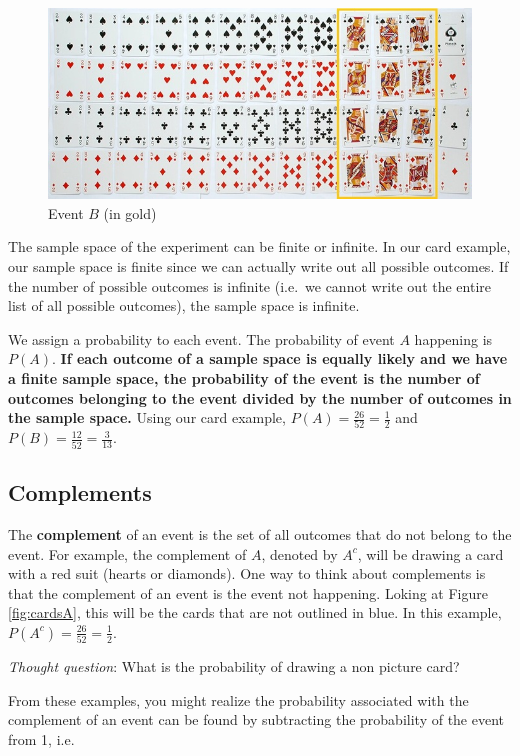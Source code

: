 \documentclass[
]{book}
\begin{document}
\begin{figure}
\centering
\includegraphics{images/02-cardsB.jpg}
\caption{\label{fig:cardsB}Event \(B\) (in gold)}
\end{figure}

The sample space of the experiment can be finite or infinite. In our card example, our sample space is finite since we can actually write out all possible outcomes. If the number of possible outcomes is infinite (i.e.~we cannot write out the entire list of all possible outcomes), the sample space is infinite.

We assign a probability to each event. The probability of event \(A\) happening is \(P(A)\). \textbf{If each outcome of a sample space is equally likely and we have a finite sample space, the probability of the event is the number of outcomes belonging to the event divided by the number of outcomes in the sample space.} Using our card example, \(P(A) = \frac{26}{52} = \frac{1}{2}\) and \(P(B) = \frac{12}{52} = \frac{3}{13}\).

\subsection{Complements}\label{complements}

The \textbf{complement} of an event is the set of all outcomes that do not belong to the event. For example, the complement of \(A\), denoted by \(A^c\), will be drawing a card with a red suit (hearts or diamonds). One way to think about complements is that the complement of an event is the event not happening. Loking at Figure \ref{fig:cardsA}, this will be the cards that are not outlined in blue. In this example, \(P(A^c) = \frac{26}{52} = \frac{1}{2}\).

\emph{Thought question}: What is the probability of drawing a non picture card?

From these examples, you might realize the probability associated with the complement of an event can be found by subtracting the probability of the event from 1, i.e.
\end{document}
